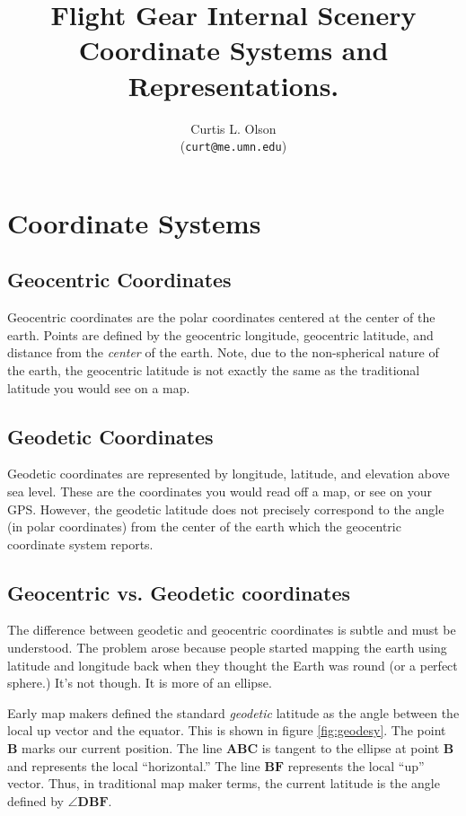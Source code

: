 \documentclass[12pt]{article}
\begin{document}
\title{
  Flight Gear Internal Scenery Coordinate Systems and
  Representations.
}

\author{
    Curtis L. Olson\\ 
    (\texttt{curt@me.umn.edu})
}

\maketitle

\section{Coordinate Systems}

\subsection{Geocentric Coordinates}

Geocentric coordinates are the polar coordinates centered at the
center of the earth.  Points are defined by the geocentric longitude,
geocentric latitude, and distance from the \textit{center} of the
earth.  Note, due to the non-spherical nature of the earth, the
geocentric latitude is not exactly the same as the traditional
latitude you would see on a map.

\subsection{Geodetic Coordinates}

Geodetic coordinates are represented by longitude, latitude, and
elevation above sea level.  These are the coordinates you would read
off a map, or see on your GPS.  However, the geodetic latitude does
not precisely correspond to the angle (in polar coordinates) from the
center of the earth which the geocentric coordinate system reports.

\subsection{Geocentric vs. Geodetic coordinates}

The difference between geodetic and geocentric coordinates is subtle
and must be understood.  The problem arose because people started
mapping the earth using latitude and longitude back when they thought
the Earth was round (or a perfect sphere.)  It's not though.  It is
more of an ellipse.  

Early map makers defined the standard \textit{geodetic} latitude as
the angle between the local up vector and the equator.  This is shown
in figure \ref{fig:geodesy}.  The point $\mathbf{B}$ marks our current
position.  The line $\mathbf{ABC}$ is tangent to the ellipse at point
$\mathbf{B}$ and represents the local ``horizontal.''  The line
$\mathbf{BF}$ represents the local ``up'' vector.  Thus, in
traditional map maker terms, the current latitude is the angle defined
by $\angle \mathbf{DBF}$.
\end{document}
